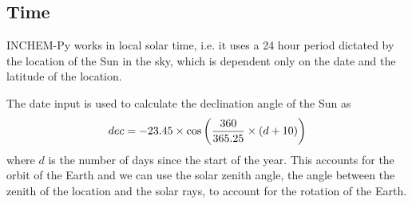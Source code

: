 \documentclass[a4paper]{refart}
\begin{document}
\subsection{Time}
INCHEM-Py works in local solar time, i.e. it uses a 24 hour period dictated by the location of the Sun in the sky, which is dependent only on the date and the latitude of the location. 

The date input is used to calculate the declination angle of the Sun as
\begin{equation}\index{declination angle}
    dec = -23.45 \times \cos\left(\frac{360}{365.25}\times (d+10)\right)
\end{equation}
where $d$ is the number of days since the start of the year. This accounts for the orbit of the Earth and we can use the solar zenith angle, the angle between the zenith of the location and the solar rays, to account for the rotation of the Earth.
\end{document}
